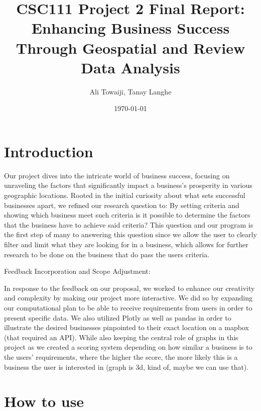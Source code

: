 \documentclass[fontsize=11pt]{article}
\title{CSC111 Project 2 Final Report: Enhancing Business Success Through Geospatial and Review Data Analysis}
\author{Ali Towaiji, Tanay Langhe}
\date{\today}
\begin{document}
\maketitle

\section*{Introduction}

Our project dives into the intricate world of business success, focusing on unraveling the factors that significantly impact a business's prosperity in various geographic locations. Rooted in the initial curiosity about what sets successful businesses apart, we refined our research question to: By setting criteria and showing which business meet such criteria is it possible to determine the factors that the business have to achieve said criteria? This question and our program is the first step of many to answering this question since we allow the user to clearly filter and limit what they are looking for in a business, which allows for further research to be done on the business that do pass the users criteria.

Feedback Incorporation and Scope Adjustment:

In response to the feedback on our proposal, we worked to enhance our creativity and complexity by making our project more interactive. We did so by expanding our computational plan to be able to receive requirements from users in order to present specific data. We also utilized Plotly as well as pandas in order to illustrate the desired businesses pinpointed to their exact location on a mapbox (that required an API). While also keeping the central role of graphs in this project as we created a scoring system depending on how similar a business is to the users' requirements, where the higher the score, the more likely this is a business the user is interested in (graph is 3d, kind of, maybe we can use that).

\section*{How to use}
\end{document}
